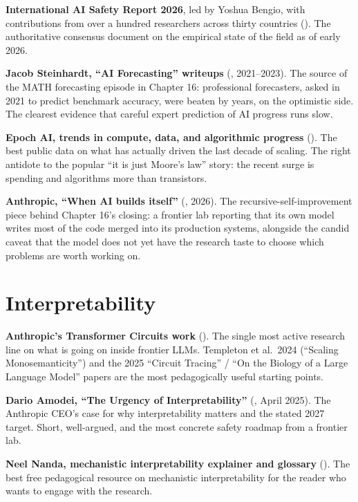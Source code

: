 \textbf{International AI Safety Report 2026}, led by Yoshua Bengio, with contributions from over a hundred researchers across thirty countries (). The authoritative consensus document on the empirical state of the field as of early 2026.

\textbf{Jacob Steinhardt, ``AI Forecasting'' writeups} (, 2021--2023). The source of the MATH forecasting episode in Chapter 16: professional forecasters, asked in 2021 to predict benchmark accuracy, were beaten by years, on the optimistic side. The clearest evidence that careful expert prediction of AI progress runs slow.

\textbf{Epoch AI, trends in compute, data, and algorithmic progress} (). The best public data on what has actually driven the last decade of scaling. The right antidote to the popular ``it is just Moore's law'' story: the recent surge is spending and algorithms more than transistors.

\textbf{Anthropic, ``When AI builds itself''} (, 2026). The recursive-self-improvement piece behind Chapter 16's closing: a frontier lab reporting that its own model writes most of the code merged into its production systems, alongside the candid caveat that the model does not yet have the research taste to choose which problems are worth working on.

\section*{Interpretability}

\textbf{Anthropic's Transformer Circuits work} (). The single most active research line on what is going on inside frontier LLMs. Templeton et al.\ 2024 (``Scaling Monosemanticity'') and the 2025 ``Circuit Tracing'' / ``On the Biology of a Large Language Model'' papers are the most pedagogically useful starting points.

\textbf{Dario Amodei, ``The Urgency of Interpretability''} (, April 2025). The Anthropic CEO's case for why interpretability matters and the stated 2027 target. Short, well-argued, and the most concrete safety roadmap from a frontier lab.

\textbf{Neel Nanda, mechanistic interpretability explainer and glossary} (). The best free pedagogical resource on mechanistic interpretability for the reader who wants to engage with the research.

